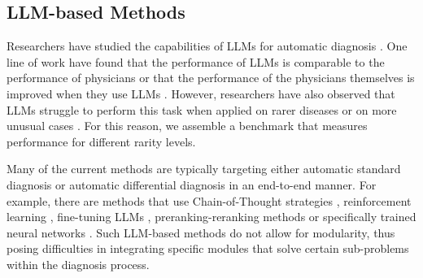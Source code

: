 \subsection{LLM-based Methods} %
Researchers have studied the capabilities of LLMs for automatic diagnosis \cite{mizuta2024diagnosis}. One line of work have found that the performance of LLMs is comparable to the performance of physicians \cite{hirosawa2023chatgpt,rutledge2024diagnostic} or that the performance of the physicians themselves is improved when they use LLMs \cite{ten2024chatgpt}. However, researchers have also observed that LLMs struggle to perform this task when applied on rarer diseases or on more unusual cases \cite{fabre2024evaluating,shikino2024evaluation}. For this reason, we assemble a benchmark that measures performance for different rarity levels.

Many of the current methods are typically targeting either automatic standard diagnosis or automatic differential diagnosis in an end-to-end manner. For example, there are methods that use Chain-of-Thought strategies \cite{wu2023large,savage2024diagnostic,nachane2024few}, reinforcement learning \cite{fansi2022towards}, fine-tuning LLMs \cite{alam2023ddxt,reese2024limitations}, preranking-reranking methods \cite{sun2024conversational} or specifically trained neural networks \cite{liu2020deep,hwang2022differential}. Such LLM-based methods do not allow for modularity, thus posing difficulties in integrating specific modules that solve certain sub-problems within the diagnosis process.

